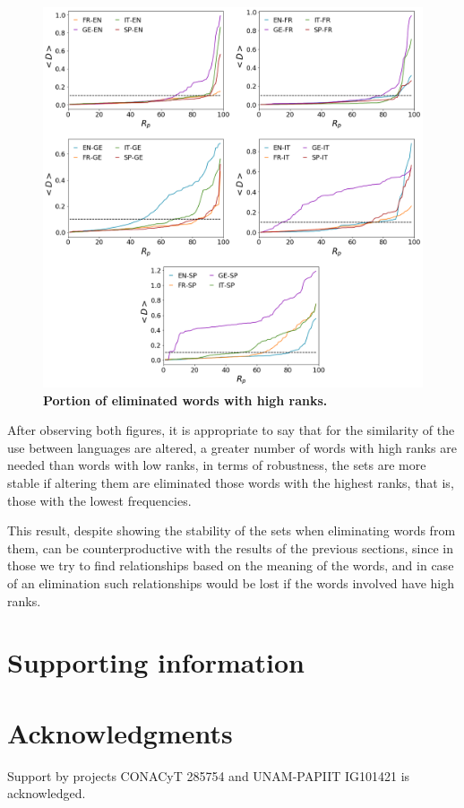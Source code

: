 \documentclass[10pt,letterpaper]{article} %
\begin{document}
\begin{figure}[!h]
	\begin{adjustwidth}{-2.5cm}{1cm}
		\centering
		\includegraphics[scale=.38]{Rp_altos.png}
		\caption{{\bf Portion of eliminated words with high ranks.} }
		\label{fig.RP_high}
	\end{adjustwidth}
\end{figure}

After observing both figures, it is appropriate to say that for the similarity of the use between languages are altered, a greater number of words with high ranks are needed than words with low ranks, in terms of robustness, the sets are more stable if altering them are eliminated those words with the highest ranks, that is, those with the lowest frequencies.

This result, despite showing the stability of the sets when eliminating words from them, can be counterproductive with the results of the previous sections, since in those we try to find relationships based on the meaning of the words, and in case of an elimination such relationships would be lost if the words involved have high ranks.


\section*{Supporting information} %
\section*{Acknowledgments} %

\nolinenumbers

Support by projects CONACyT 285754 and UNAM-PAPIIT IG101421 is acknowledged. 
% 
 
\end{document}
